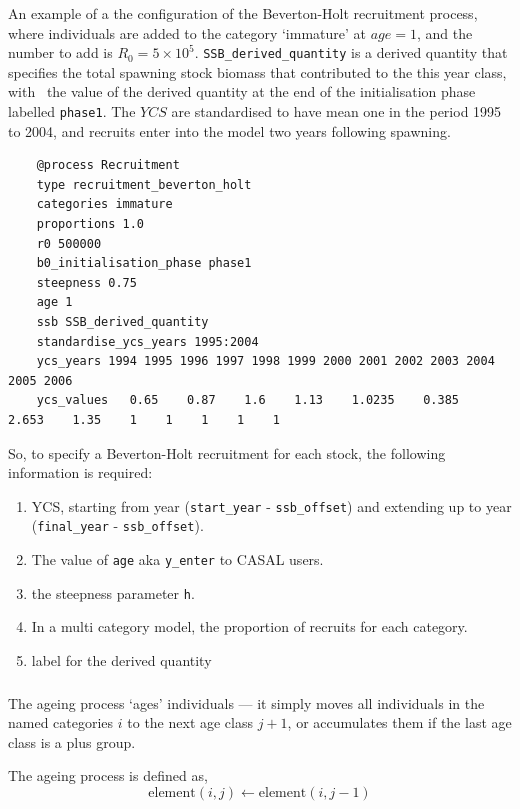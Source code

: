 An example of a the configuration of the Beverton-Holt recruitment process, where individuals are added to the category `immature' at $age=1$, and the number to add is $R_0=5 \times 10^5$. \texttt{SSB\_derived\_quantity} is a derived quantity that specifies the total spawning stock biomass that contributed to the this year class, with \Bzero\ the value of the derived quantity at the end of the initialisation phase labelled \texttt{phase1}. The $YCS$ are standardised to have mean one in the period 1995 to 2004, and recruits enter into the model two years following spawning.


{\small{\begin{verbatim}
	@process Recruitment
	type recruitment_beverton_holt
	categories immature
	proportions 1.0
	r0 500000
	b0_initialisation_phase phase1
	steepness 0.75
	age 1
	ssb SSB_derived_quantity
	standardise_ycs_years 1995:2004
	ycs_years 1994 1995 1996 1997 1998 1999 2000 2001 2002 2003 2004 2005 2006
	ycs_values   0.65    0.87    1.6    1.13    1.0235    0.385   2.653    1.35    1    1    1    1    1
\end{verbatim}}}

So, to specify a Beverton-Holt recruitment for each stock, the following information is required:
\begin{enumerate}
	\item YCS, starting from year (\texttt{start\_year} - \texttt{ssb\_offset}) and extending up to year (\texttt{final\_year} - \texttt{ssb\_offset}).
	\item The value of \texttt{age} aka \texttt{y\_enter} to CASAL users.
	\item the steepness parameter \texttt{h}.
	\item In a multi category model, the proportion of recruits for each category.
	\item label for the derived quantity
\end{enumerate}
\subsubsection{\label{sec:ageing}}

The ageing process `ages' individuals --- it simply moves all individuals in the named categories $i$ to the next age class $j + 1$, or accumulates them if the last age class is a plus group. 

The ageing process is defined as,
\begin{equation}
  \text{element}(i,j) \leftarrow \text{element}(i,j-1)
\end{equation}

